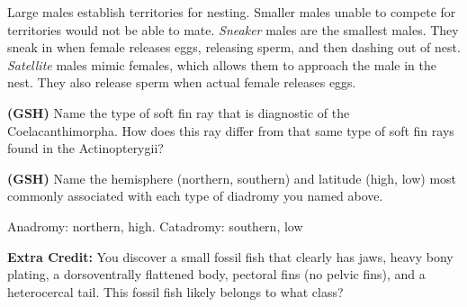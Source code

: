 \begin{solution}
Large males establish territories for nesting. Smaller males unable to compete for territories would not be able to mate. \textit{Sneaker} males are the smallest males. They sneak in when female releases eggs, releasing sperm, and then dashing out of nest. \textit{Satellite} males mimic females, which allows them to approach the male in the nest. They also release sperm when actual female releases eggs.
\end{solution}

\textbf{(GSH)} Name the type of soft fin ray that is diagnostic of the Coelacanthimorpha. How does this ray differ from that same type of soft fin rays found in the Actinopterygii?

\textbf{(GSH)} Name the hemisphere (northern, southern) and latitude (high, low) most commonly associated with each type of diadromy you named above.
\begin{solution}Anadromy: northern, high. Catadromy: southern, low\end{solution}

\question[2]
\textbf{Extra Credit:} You discover a small fossil fish that clearly has jaws, heavy bony plating, a dorsoventrally flattened body, pectoral fins (no pelvic fins), and a heterocercal tail.  This fossil fish likely belongs to what class?

